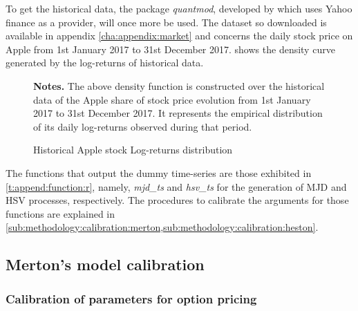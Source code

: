 \documentclass[12pt,a4paper]{report}
\begin{document}
To get the historical data, the package \textit{quantmod}, developed by \citet{quantmod} which uses Yahoo finance as a provider,  will once more be used. The dataset so downloaded is available in appendix \ref{cha:appendix:market} and concerns the daily stock price on Apple from 1st January 2017 to 31st December 2017.
 shows the density curve generated by the log-returns of historical data.

\begin{figure}[h]
  \centering
  
  \caption{Historical Apple stock Log-returns distribution}
  \begin{changemargin}{0.5cm}{0.5cm}
  \medskip
\footnotesize
{}\textbf{Notes.} The above density function is constructed over the historical data of the Apple share of stock price evolution from 1st January 2017 to 31st December 2017. 
It represents the empirical distribution of its daily log-returns observed during that period.
  \end{changemargin}
  \label{p:methodology:density:aapl}
\end{figure}

The functions that output the dummy time-series are those exhibited in \cref{t:append:function:r}, namely, \textit{mjd\_ts} and \textit{hsv\_ts} for the generation of  MJD and HSV processes, respectively.
The procedures to calibrate the arguments for those functions are explained in \cref{sub:methodology:calibration:merton,sub:methodology:calibration:heston}.










\subsection{Merton's model calibration}
\label{sub:methodology:calibration:merton}

\subsubsection*{Calibration of parameters for option pricing}
\end{document}
